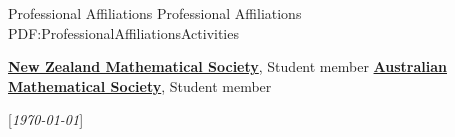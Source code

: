 \documentclass[a4paper,yyyy,nonstopmode,10pt]{simpleresumecv}
\newcommand{\CVNote}{\today}
\begin{document}
\begin{Body}

\Section
{Professional Affiliations}
{Professional Affiliations}
{PDF:ProfessionalAffiliationsActivities}

\Gap
\Entry
\href{http://nzmathsoc.org.nz/}
{\textbf{New Zealand Mathematical Society}},
Student member
\Gap
\Entry
\href{https://austms.org.au}
{\textbf{Australian Mathematical Society}},
Student member



%


\end{Body}


\BigGap
\UseNoteFont%
\null\hfill%
[\textit{\CVNote}]
\end{document}
